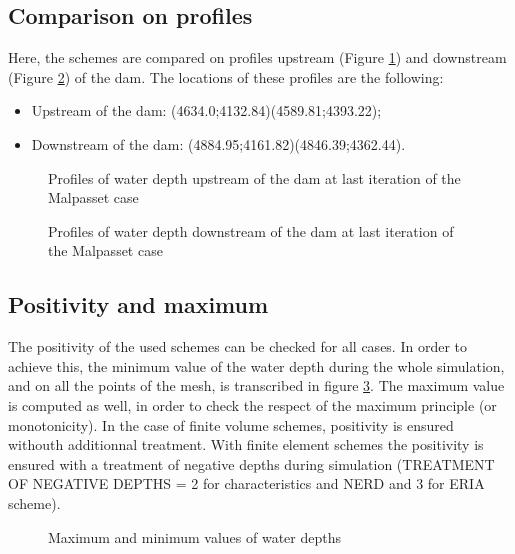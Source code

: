 \subsection{Comparison on profiles}
Here, the schemes are compared on profiles upstream (Figure \ref{fig:malpasset:upstreamProfile}) and downstream (Figure \ref{fig:malpasset:downstreamProfile}) of the dam. The locations of these profiles are the following:
\begin{itemize}
\itemsep0em
\item Upstream of the dam: (4634.0;4132.84)(4589.81;4393.22);
\item Downstream of the dam: (4884.95;4161.82)(4846.39;4362.44).
\end{itemize}

\begin{figure}[H]
  \centering
  \caption{Profiles of water depth upstream of the dam at last iteration of the Malpasset case}\label{fig:malpasset:upstreamProfile}
\end{figure}

\begin{figure}[H]
  \centering
  \caption{Profiles of water depth downstream of the dam at last iteration of the Malpasset case}\label{fig:malpasset:downstreamProfile}
\end{figure}


\subsection{Positivity and maximum}

The positivity of the used schemes can be checked for all cases. In order to achieve this, the minimum value of the water depth during the whole simulation, and on all the points of the mesh, is transcribed in figure \ref{fig:malpasset:minmax}.
The maximum value is computed as well, in order to check the respect of the maximum principle (or monotonicity). 
In the case of finite volume schemes, positivity is ensured withouth additionnal treatment.
With finite element schemes the positivity is ensured with a treatment of negative depths
during simulation (TREATMENT OF NEGATIVE DEPTHS = 2 for characteristics and NERD and 3 for ERIA scheme).

\begin{figure}[H]
\centering
{}
\caption{Maximum and minimum values of water depths}
\label{fig:malpasset:minmax}
\end{figure}

